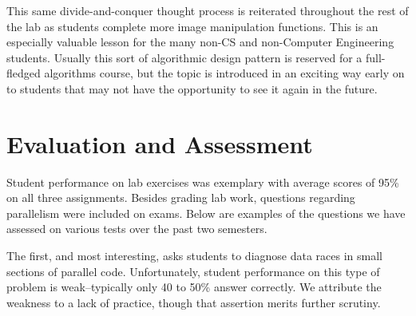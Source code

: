 \documentclass[conference]{./IEEEtran}
\begin{document}
This same divide-and-conquer thought process is reiterated throughout the rest
of the lab as students complete more image manipulation functions. This is an
especially valuable lesson for the many non-CS and non-Computer Engineering
students. Usually this sort of algorithmic design pattern is reserved for a
full-fledged algorithms course, but the topic is introduced in an exciting way
early on to students that may not have the opportunity to see it again in the
future.

\section{Evaluation and Assessment}

Student performance on lab exercises was exemplary with average scores of 95\%
on all three assignments.  Besides grading lab work, questions regarding
parallelism were included on exams. Below are examples of the questions we have
assessed on various tests over the past two semesters.

The first, and most interesting, asks students to diagnose data races in small
sections of parallel code.  Unfortunately, student performance on this type of
problem is weak--typically only 40 to 50\% answer correctly.   We attribute the
weakness to a lack of practice, though that assertion merits further scrutiny.
\end{document}
